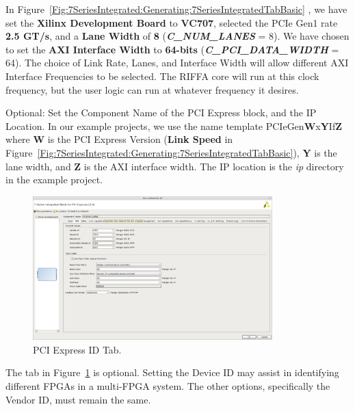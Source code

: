 \documentclass{refrep}
\newcommand{\Directory}[1]{\textit{#1}}
\newcommand{\ConfigSetting}[1]{\textbf{#1}}
\newcommand{\RIFFAParameter}[1]{\textit{\textbf{#1}}}
\begin{document}
In Figure~\ref{Fig:7SeriesIntegrated:Generating:7SeriesIntegratedTabBasic} , we
have set the \ConfigSetting{Xilinx Development Board} to \ConfigSetting{VC707},
selected the PCIe Gen1 rate \ConfigSetting{2.5 GT/s}, and a \ConfigSetting{Lane
  Width} of \ConfigSetting{8} (\RIFFAParameter{C\_NUM\_LANES} = 8). We have
chosen to set the \ConfigSetting{AXI Interface Width} to \ConfigSetting{64-bits}
(\RIFFAParameter{C\_PCI\_DATA\_WIDTH} = 64). The choice of Link Rate, Lanes, and
Interface Width will allow different AXI Interface Frequencies to be
selected. The RIFFA core will run at this clock frequency, but the user logic
can run at whatever frequency it desires.

Optional: Set the Component Name of the PCI Express block, and the IP
Location. In our example projects, we use the name template
PCIeGen\textbf{W}x\textbf{Y}If\textbf{Z} where \textbf{W} is the PCI Express
Version (\ConfigSetting{Link Speed} in
Figure~\ref{Fig:7SeriesIntegrated:Generating:7SeriesIntegratedTabBasic}),
\textbf{Y} is the lane width, and \textbf{Z} is the AXI interface width.  The IP
location is the \Directory{ip} directory in the example project.

\begin{figure}[H]
  \includegraphics[width=350px,center]{7SeriesIntegratedTabIDs.png}
  \caption{PCI Express ID Tab.}
  \label{Fig:7SeriesIntegrated:Generating:7SeriesIntegratedTabIDs}
\end{figure}
The tab in Figure~\ref{Fig:7SeriesIntegrated:Generating:7SeriesIntegratedTabIDs}
is optional. Setting the Device ID may assist in identifying different FPGAs in
a multi-FPGA system. The other options, specifically the Vendor ID, must remain
the same.
\end{document}
